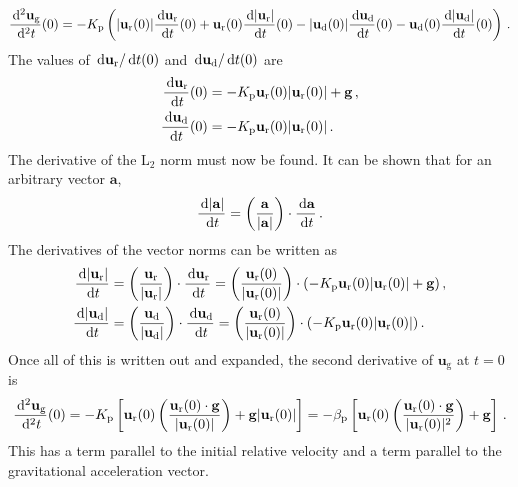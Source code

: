 \begin{align}
    \frac{\,\mathrm{d}^2 \mathbf{u}_\text{g}}{\,\mathrm{d}^2 t}(0) = -K_{\rm p} \left(|\mathbf{u}_\text{r}(0)| \frac{\,\mathrm{d} \mathbf{u}_\text{r}}{\,\mathrm{d} t}(0)
+ \mathbf{u}_\text{r}(0) \frac{\,\mathrm{d} |\mathbf{u}_\text{r}|}{\,\mathrm{d} t}(0) - |\mathbf{u}_\text{d}(0)| \frac{\,\mathrm{d} \mathbf{u}_\text{d}}{\,\mathrm{d}
t}(0) - \mathbf{u}_\text{d}(0) \frac{\,\mathrm{d} |\mathbf{u}_\text{d}|}{\,\mathrm{d} t}(0)\right) \,.
\end{align}
The values of $\,\mathrm{d} \mathbf{u}_\text{r} / \,\mathrm{d} t(0)$ and $\,\mathrm{d} \mathbf{u}_\text{d} / \,\mathrm{d} t(0)$ are
\begin{align*}
    \frac{\,\mathrm{d} \mathbf{u}_\text{r}}{\,\mathrm{d} t}(0) &= -K_{\rm p} \mathbf{u}_{\text{r}}(0) |\mathbf{u}_{\text{r}}(0)| + \mathbf{g} \,, \\
    \frac{\,\mathrm{d} \mathbf{u}_\text{d}}{\,\mathrm{d} t}(0) &= -K_{\rm p} \mathbf{u}_{\text{r}}(0) |\mathbf{u}_{\text{r}}(0)| \,.
\end{align*}
The derivative of the L$_2$ norm must now be found. It can be shown that for an arbitrary vector $\mathbf{a}$,
\begin{align*}
    \frac{\,\mathrm{d} |\mathbf{a}|}{\,\mathrm{d} t} = \left(\frac{\mathbf{a}}{|\mathbf{a}|}\right) \cdot \frac{\,\mathrm{d} \mathbf{a}}{\,\mathrm{d} t} \,.
\end{align*}
The derivatives of the vector norms can be written as
\begin{align}
    \frac{\,\mathrm{d} |\mathbf{u}_\text{r}|}{\,\mathrm{d} t} &= \left(\frac{\mathbf{u}_\text{r}}{|\mathbf{u}_\text{r}|}\right) \cdot \frac{\,\mathrm{d}
\mathbf{u}_\text{r}}{\,\mathrm{d} t} = \left(\frac{\mathbf{u}_{\text{r}}(0)}{|\mathbf{u}_{\text{r}}(0)|}\right) \cdot (-K_{\rm p}
\mathbf{u}_{\text{r}}(0) |\mathbf{u}_{\text{r}}(0)| + \mathbf{g}) \,,  \\
    \frac{\,\mathrm{d} |\mathbf{u}_\text{d}|}{\,\mathrm{d} t} &= \left(\frac{\mathbf{u}_\text{d}}{|\mathbf{u}_\text{d}|}\right) \cdot \frac{\,\mathrm{d}
\mathbf{u}_\text{d}}{\,\mathrm{d} t} = \left(\frac{\mathbf{u}_{\text{r}}(0)}{|\mathbf{u}_{\text{r}}(0)|}\right) \cdot (-K_{\rm p}
\mathbf{u}_{\text{r}}(0) |\mathbf{u}_{\text{r}}(0)|) \,.
\end{align}
Once all of this is written out and expanded, the second derivative of $\mathbf{u}_\text{g}$ at $t = 0$ is
\begin{align}
    \frac{\,\mathrm{d}^2 \mathbf{u}_\text{g}}{\,\mathrm{d}^2 t}(0) = -K_{\rm p} \left[\mathbf{u}_{\text{r}}(0) \left(\frac{\mathbf{u}_{\text{r}}(0)
\cdot \mathbf{g}}{|\mathbf{u}_{\text{r}}(0)|}\right) + \mathbf{g} |\mathbf{u}_{\text{r}}(0)|\right] = - \beta_{\rm p}
\left[\mathbf{u}_{\text{r}}(0) \left(\frac{\mathbf{u}_{\text{r}}(0) \cdot \mathbf{g}}{|\mathbf{u}_{\text{r}}(0)|^2}\right) +
\mathbf{g}\right] \,.
\end{align}
This has a term parallel to the initial relative velocity and a term parallel to the gravitational acceleration vector.

